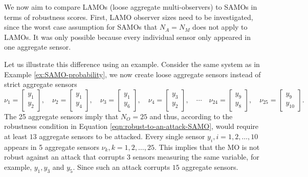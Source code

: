 We now aim to compare LAMOs (loose aggregate multi-observers) to SAMOs in terms of robustness scores. First, LAMO observer sizes need to be investigated, since the worst case assumption for SAMOs that $N_A=N_M$ does not apply to LAMOs. It was only possible because every individual sensor only appeared in one aggregate sensor. 

\begin{example}\label{ex:LAMO-attack}
    Let us illustrate this difference using an example. Consider the same system as in Example \ref{ex:SAMO-probability}, we now create loose aggregate sensors instead of strict aggregate sensors
    \begin{equation*}
        \nu_1 = 
        \begin{bmatrix}
            y_1 \\ y_2
        \end{bmatrix}, \quad
        \nu_2 = 
        \begin{bmatrix}
            y_1 \\ y_4
        \end{bmatrix}, \quad
        \nu_3 = 
        \begin{bmatrix}
            y_1 \\ y_6
        \end{bmatrix}, \quad
        \nu_4 =
        \begin{bmatrix}
            y_3 \\ y_2
        \end{bmatrix}, \quad \cdots \quad
        \nu_{24} = 
        \begin{bmatrix}
            y_9 \\ y_{8}
        \end{bmatrix}, \quad
        \nu_{25} =
        \begin{bmatrix}
            y_9 \\ y_{10}
        \end{bmatrix}.
    \end{equation*}
    The 25 aggregate sensors imply that $N_O=25$ and thus, according to the robustness condition in Equation \eqref{eqn:robust-to-an-attack-SAMO}, would require at least $13$ aggregate sensors to be attacked. Every single sensor $y_i,i=1,2,\dots,10$ appears in 5 aggregate sensors $\nu_k,k=1,2,\dots,25$. This implies that the MO is not robust against an attack that corrupts 3 sensors measuring the same variable, for example, $y_1, y_3$ and $y_5$. Since such an attack corrupts $15$ aggregate sensors.
\end{example}
